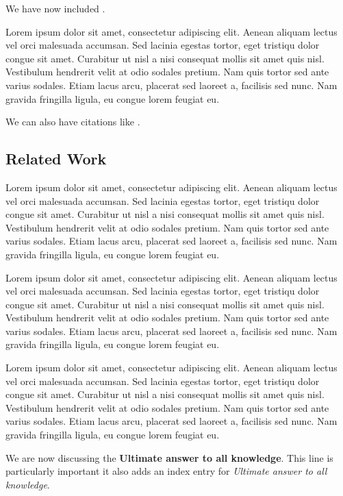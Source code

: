 We have now included .



Lorem ipsum dolor sit amet, consectetur adipiscing elit. Aenean aliquam lectus vel orci malesuada accumsan. Sed lacinia egestas tortor, eget tristiqu dolor congue sit amet. Curabitur ut nisl a nisi consequat mollis sit amet quis nisl. Vestibulum hendrerit velit at odio sodales pretium. Nam quis tortor sed ante varius sodales. Etiam lacus arcu, placerat sed laoreet a, facilisis sed nunc. Nam gravida fringilla ligula, eu congue lorem feugiat eu.

We can also have citations like \cite{cite-wifichip}.

\subsection{Related Work}

Lorem ipsum dolor sit amet, consectetur adipiscing elit. Aenean aliquam lectus vel orci malesuada accumsan. Sed lacinia egestas tortor, eget tristiqu dolor congue sit amet. Curabitur ut nisl a nisi consequat mollis sit amet quis nisl. Vestibulum hendrerit velit at odio sodales pretium. Nam quis tortor sed ante varius sodales. Etiam lacus arcu, placerat sed laoreet a, facilisis sed nunc. Nam gravida fringilla ligula, eu congue lorem feugiat eu.


Lorem ipsum dolor sit amet, consectetur adipiscing elit. Aenean aliquam lectus vel orci malesuada accumsan. Sed lacinia egestas tortor, eget tristiqu dolor congue sit amet. Curabitur ut nisl a nisi consequat mollis sit amet quis nisl. Vestibulum hendrerit velit at odio sodales pretium. Nam quis tortor sed ante varius sodales. Etiam lacus arcu, placerat sed laoreet a, facilisis sed nunc. Nam gravida fringilla ligula, eu congue lorem feugiat eu.


Lorem ipsum dolor sit amet, consectetur adipiscing elit. Aenean aliquam lectus vel orci malesuada accumsan. Sed lacinia egestas tortor, eget tristiqu dolor congue sit amet. Curabitur ut nisl a nisi consequat mollis sit amet quis nisl. Vestibulum hendrerit velit at odio sodales pretium. Nam quis tortor sed ante varius sodales. Etiam lacus arcu, placerat sed laoreet a, facilisis sed nunc. Nam gravida fringilla ligula, eu congue lorem feugiat eu.

We are now discussing the \textbf{Ultimate answer to all knowledge}.
This line is particularly important it also adds an index entry for \textit{Ultimate answer to all knowledge}.

